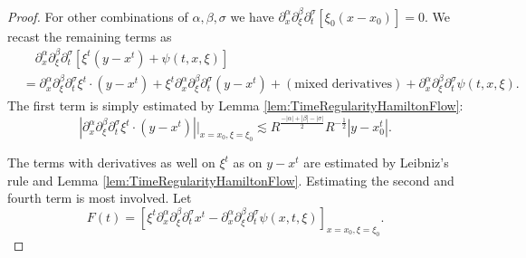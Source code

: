 \documentclass{amsart}
\theoremstyle{definition}
\begin{document}
\begin{proof}
For other combinations of $\alpha,\beta,\sigma$ we have $\partial_x^{\alpha} \partial_{\xi}^{\beta} \partial_t^{\sigma} [ \xi_0 (x-x_0)] = 0$. We recast the remaining terms as
\begin{equation*}
\begin{split}
&\quad \partial_x^{\alpha} \partial_{\xi}^{\beta} \partial_t^{\sigma} [  \xi^t (y-x^t) +  \psi(t,x,\xi)] \\
 &=  \partial_x^{\alpha} \partial_{\xi}^{\beta} \partial_{t}^{\sigma} \xi^t \cdot (y-x^t) +  \xi^t \partial_x^{\alpha} \partial_{\xi}^{\beta} \partial_t^{\sigma} (y-x^t) + (\text{mixed derivatives}) + \partial_x^{\alpha} \partial_{\xi}^{\beta} \partial_t^{\sigma}  \psi(t,x,\xi).
\end{split}
\end{equation*}
The first term is simply estimated by Lemma \ref{lem:TimeRegularityHamiltonFlow}:
\begin{equation*}
|\partial_x^{\alpha} \partial_{\xi}^{\beta} \partial_t^{\sigma} \xi^t \cdot (y-x^t)| \big\vert_{x=x_0,\xi=\xi_0} \lesssim R^{\frac{-|\alpha|+|\beta|-|\sigma|}{2}} R^{-\frac{1}{2}} |y-x_0^t|.
\end{equation*}

The terms with derivatives as well on $\xi^t$ as on $y-x^t$ are estimated by Leibniz's rule and Lemma \ref{lem:TimeRegularityHamiltonFlow}. Estimating the second and fourth term is most involved. Let
\begin{equation*}
F(t) = [ \xi^t \partial_x^{\alpha} \partial_{\xi}^{\beta} \partial_t^{\sigma} x^t - \partial_x^{\alpha} \partial_{\xi}^{\beta} \partial_t^{\sigma} \psi(x,t,\xi) ]_{x=x_0,\xi=\xi_0}.
\end{equation*}


\end{proof}
\end{document}
